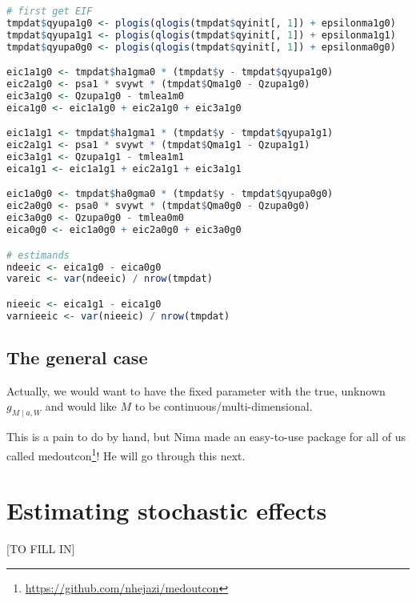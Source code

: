 \documentclass[
  12pt, krantz2,
]{book}
\renewcommand{\href}[2]{#2\footnote{\url{#1}}}
\theoremstyle{definition}
\theoremstyle{definition}
\theoremstyle{definition}
\newcommand{\1}{\mathbbm{1}}
\begin{document}
\begin{lstlisting}[language=R]
# first get EIF
tmpdat$qyupa1g0 <- plogis(qlogis(tmpdat$qyinit[, 1]) + epsilonma1g0)
tmpdat$qyupa1g1 <- plogis(qlogis(tmpdat$qyinit[, 1]) + epsilonma1g1)
tmpdat$qyupa0g0 <- plogis(qlogis(tmpdat$qyinit[, 1]) + epsilonma0g0)

eic1a1g0 <- tmpdat$ha1gma0 * (tmpdat$y - tmpdat$qyupa1g0)
eic2a1g0 <- psa1 * svywt * (tmpdat$Qma1g0 - Qzupa1g0)
eic3a1g0 <- Qzupa1g0 - tmlea1m0
eica1g0 <- eic1a1g0 + eic2a1g0 + eic3a1g0

eic1a1g1 <- tmpdat$ha1gma1 * (tmpdat$y - tmpdat$qyupa1g1)
eic2a1g1 <- psa1 * svywt * (tmpdat$Qma1g1 - Qzupa1g1)
eic3a1g1 <- Qzupa1g1 - tmlea1m1
eica1g1 <- eic1a1g1 + eic2a1g1 + eic3a1g1

eic1a0g0 <- tmpdat$ha0gma0 * (tmpdat$y - tmpdat$qyupa0g0)
eic2a0g0 <- psa0 * svywt * (tmpdat$Qma0g0 - Qzupa0g0)
eic3a0g0 <- Qzupa0g0 - tmlea0m0
eica0g0 <- eic1a0g0 + eic2a0g0 + eic3a0g0

# estimands
ndeeic <- eica1g0 - eica0g0
vareic <- var(ndeeic) / nrow(tmpdat)

nieeic <- eica1g1 - eica1g0
varnieeic <- var(nieeic) / nrow(tmpdat)
\end{lstlisting}

\hypertarget{the-general-case}{%
\section{The general case}\label{the-general-case}}

Actually, we would want to have the fixed parameter with the true, unknown
\(g_{M \mid a, W}\) and would like \(M\) to be continuous/multi-dimensional.

This is a pain to do by hand, but Nima made an easy-to-use package for all of us
called \href{https://github.com/nhejazi/medoutcon}{medoutcon}! He will go through
this next.

\hypertarget{estimating-stochastic-effects}{%
\chapter{Estimating stochastic effects}\label{estimating-stochastic-effects}}

{[}TO FILL IN{]}

  

\backmatter
\printindex
\end{document}

